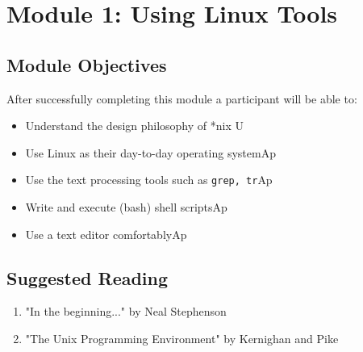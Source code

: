 \documentclass{article}
\begin{document}
\section{Module 1: Using Linux Tools}
\label{ULT}
\subsection{Module Objectives}
After successfully completing this module a participant will be able to:
	\begin{itemize}
	\item Understand the design philosophy of *nix \hfill U\phantom{p}
	\item Use Linux as their day-to-day operating system\hfill Ap
	\item Use the text processing tools such as \texttt{grep, tr}\hfill Ap
	\item Write and execute (bash) shell scripts\hfill Ap
	\item Use a text editor comfortably\hfill Ap
	\end{itemize}
\subsection{Suggested Reading}
\begin{enumerate}
	\item "In the beginning..." by Neal Stephenson
	\item "The Unix Programming Environment" by Kernighan and Pike
\end{enumerate}
\end{document}
